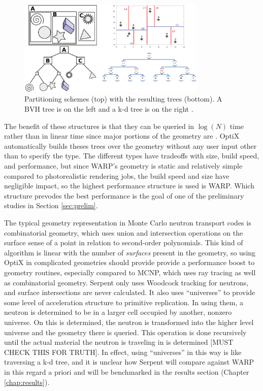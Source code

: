 \begin{figure}[h!] 
\centering
\includegraphics[width=0.8\textwidth, trim= 8cm 0cm 0cm 0cm ]{graphics/bvh_kd.eps}
\caption{Partitioning schemes (top) with the resulting trees (bottom). A BVH tree \cite{wikimedia_bvh} is on the left and a k-d tree is on the right \cite{wikimedia_kd}.   \label{bvh_kd}}
\end{figure}

The benefit of these structures is that they can be queried in $\log(N)$ time rather than in linear time since major portions of the geometry are \cite{something}.  OptiX automatically builds theses trees over the geometry without any user input other than to specify the type.  The different types have tradeoffs with size, build speed, and performance, but since WARP's geometry is static and relatively simple compared to photorealistic rendering jobs, the build speed and size have negligible impact, so the highest performance structure is used is WARP.  Which structure prevodes the best performance is the goal of one of the preliminary studies in Section \ref{sec:prelim}.  

The typical geometry representation in Monte Carlo neutron transport codes is combinatorial geometry, which uses union and intersection operations on the surface sense  of a point in relation to second-order polynomials.  This kind of algorithm is linear with the number of \emph{surfaces} present in the geometry, so using OptiX in complicated geometries should provide provide a performance boost to geometry routines, especially compared to MCNP, which uses ray tracing as well as combinatorial geometry.  Serpent only uses Woodcock tracking for neutrons, and surface intersections are never calculated.  It also uses ``universes'' to provide some level of acceleration structure to primitive replication.  In using them, a neutron is determined to be in a larger cell occupied by another, nonzero universe.  On this is determined, the neutron is transformed into the higher level universe and the geometry there is queried.  This operation is done recursively until the actual material the neutron is traveling in is determined \cite{jaakko}[MUST CHECK THIS FOR TRUTH].  In effect, using ``universes'' in this way is like traversing a k-d tree, and it is unclear how Serpent will compare against WARP in this regard a priori and will be benchmarked in the results section (Chapter \ref{chap:results}).


